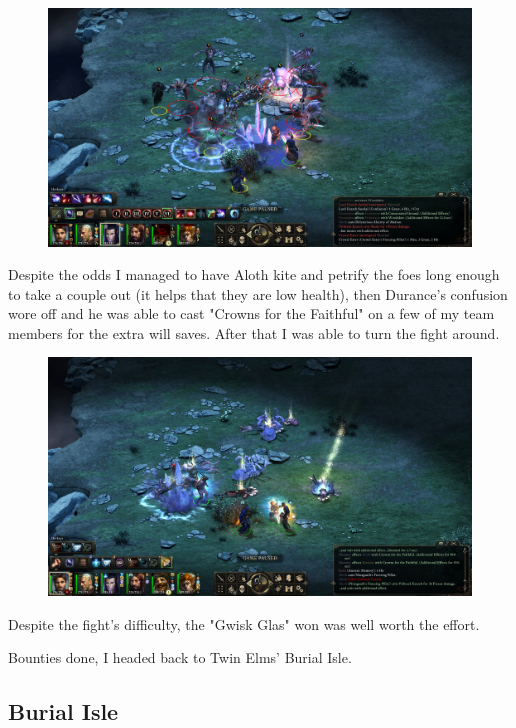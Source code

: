 \documentclass{article}
\begin{document}
\begin{figure}
\includegraphics[scale=0.33]{files/blog/2019_03_04_pillars_of_eternity_path_of_the_damned_act_iii/2019_03_04_sserkal2.jpg}
\end{figure}

Despite the odds I managed to have Aloth kite and petrify the foes long enough to take a couple out (it helps that they are low health), then Durance's confusion wore off and he was able to cast "Crowns for the Faithful" on a few of my team members for the extra will saves.  After that I was able to turn the fight around.

\begin{figure}
\includegraphics[scale=0.33]{files/blog/2019_03_04_pillars_of_eternity_path_of_the_damned_act_iii/2019_03_04_sserkal3.jpg}
\end{figure}

Despite the fight's difficulty, the "Gwisk Glas" won was well worth the effort.

Bounties done, I headed back to Twin Elms' Burial Isle.

\subsection{Burial Isle}
\end{document}
